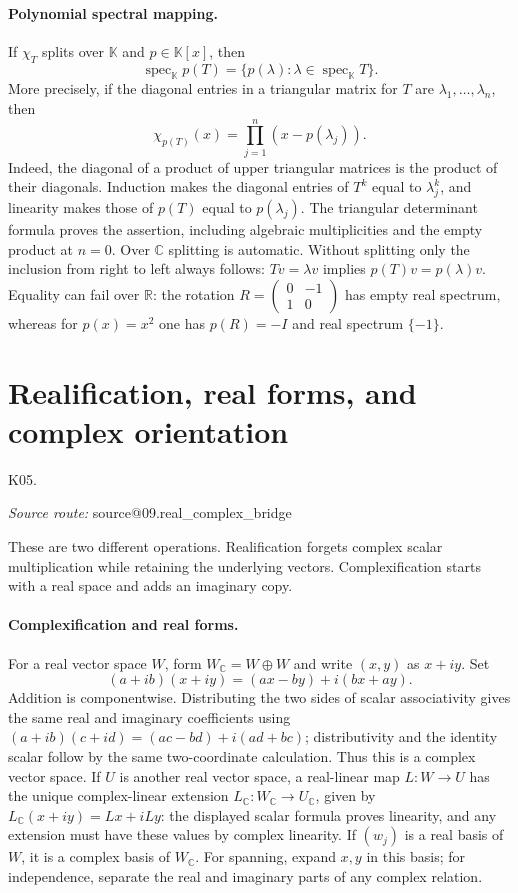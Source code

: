 \documentclass[11pt,a4paper]{book}
\makeatletter
\theoremstyle{definition}\newtheorem{definition}[theorem]{Definition}
\theoremstyle{remark}\newtheorem{remark}[theorem]{Remark}
\newcommand{\K}{\mathbb K}\newcommand{\R}{\mathbb R}\newcommand{\C}{\mathbb C}
\newcommand{\Kentry}[2]{\section{#2}\label{k:#1}\noindent\textsf{\small K05.\detokenize{#1}}\par
  \begingroup\small\color{black!65}\textit{Source route: }\csname source@#1\endcsname\par\endgroup}
\makeatother
\begin{document}
\paragraph{Polynomial spectral mapping.}
If $\chi_T$ splits over $\K$ and $p\in\K[x]$, then
\[\operatorname{spec}_\K p(T)=\{p(\lambda):\lambda\in\operatorname{spec}_\K T\}.
\]
More precisely, if the diagonal entries in a triangular matrix for $T$ are $\lambda_1,\ldots,\lambda_n$, then
\[\chi_{p(T)}(x)=\prod_{j=1}^n(x-p(\lambda_j)).\]
Indeed, the diagonal of a product of upper triangular matrices is the product of their diagonals. Induction makes the diagonal entries of $T^k$ equal to $\lambda_j^k$, and linearity makes those of $p(T)$ equal to $p(\lambda_j)$. The triangular determinant formula proves the assertion, including algebraic multiplicities and the empty product at $n=0$. Over $\C$ splitting is automatic. Without splitting only the inclusion from right to left always follows: $Tv=\lambda v$ implies $p(T)v=p(\lambda)v$. Equality can fail over $\R$: the rotation $R=\begin{pmatrix}0&-1\\1&0\end{pmatrix}$ has empty real spectrum, whereas for $p(x)=x^2$ one has $p(R)=-I$ and real spectrum $\{-1\}$.

\Kentry{09.real_complex_bridge}{Realification, real forms, and complex orientation}
These are two different operations. Realification forgets complex scalar multiplication while retaining the underlying vectors. Complexification starts with a real space and adds an imaginary copy.

\paragraph{Complexification and real forms.}
For a real vector space $W$, form $W_\C=W\oplus W$ and write $(x,y)$ as $x+iy$. Set
\[(a+ib)(x+iy)=(ax-by)+i(bx+ay).
\]
Addition is componentwise. Distributing the two sides of scalar associativity gives the same real and imaginary coefficients using $(a+ib)(c+id)=(ac-bd)+i(ad+bc)$; distributivity and the identity scalar follow by the same two-coordinate calculation. Thus this is a complex vector space. If $U$ is another real vector space, a real-linear map $L:W\to U$ has the unique complex-linear extension $L_\C:W_\C\to U_\C$, given by $L_\C(x+iy)=Lx+iLy$: the displayed scalar formula proves linearity, and any extension must have these values by complex linearity. If $(w_j)$ is a real basis of $W$, it is a complex basis of $W_\C$. For spanning, expand $x,y$ in this basis; for independence, separate the real and imaginary parts of any complex relation.
\end{document}
